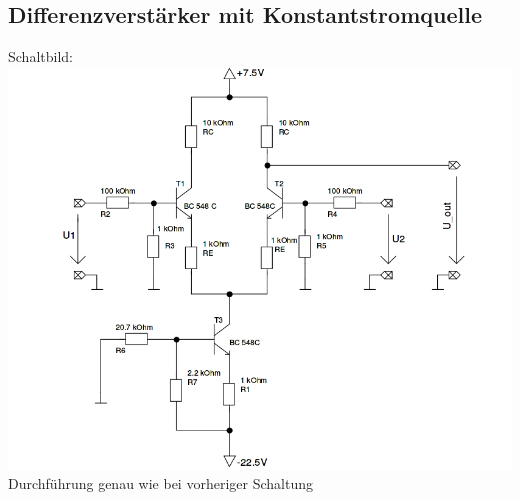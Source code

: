 \documentclass[compress,11pt]{beamer}
\begin{document}
\subsection{Differenzverstärker mit Konstantstromquelle}
\begin{frame}
Schaltbild:\\
\includegraphics[width=.7\textwidth]{schaltbilder/schalt_3d}\\
Durchführung genau wie bei vorheriger Schaltung
\end{frame}
\end{document}
